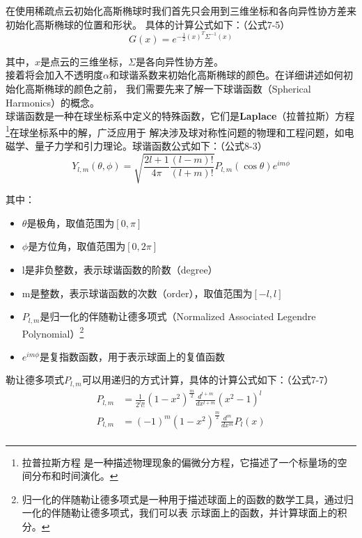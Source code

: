 \documentclass{nwputhesis}
\begin{document}
\indent
在使用稀疏点云初始化高斯椭球时我们首先只会用到三维坐标和各向异性协方差来初始化高斯椭球的位置和形状。
具体的计算公式如下：（公式7-5）
\begin{equation}
    G(x) = e^{-\frac{1}{2}(x)^T\Sigma^{-1}(x)}
\end{equation}

\indent
其中，$x$是点云的三维坐标，$\Sigma$是各向异性协方差。\\
\indent
接着将会加入不透明度$\alpha$和球谐系数来初始化高斯椭球的颜色。在详细讲述如何初始化高斯椭球的颜色之前，
我们需要先来了解一下球谐函数（Spherical Harmonics）的概念。\\
\indent
球谐函数是一种在球坐标系中定义的特殊函数，它们是\textbf{Laplace}（拉普拉斯）方程\footnote{拉普拉斯方程
是一种描述物理现象的偏微分方程，它描述了一个标量场的空间分布和时间演化。}在球坐标系中的解，广泛应用于
解决涉及球对称性问题的物理和工程问题，如电磁学、量子力学和引力理论。球谐函数公式如下：（公式8-3）
\begin{equation}
    Y_{l,m}(\theta,\phi) = \sqrt{\frac{2l+1}{4\pi}\frac{(l-m)!}{(l+m)!}}P_{l,m}(\cos\theta)e^{im\phi}
\end{equation}

\indent
其中：
\begin{itemize}
    \item $\theta$是极角，取值范围为$[0,\pi]$
    \item $\phi$是方位角，取值范围为$[0,2\pi]$
    \item l是非负整数，表示球谐函数的阶数（degree）
    \item m是整数，表示球谐函数的次数（order），取值范围为$[-l,l]$
    \item $P_{l,m}$是归一化的伴随勒让德多项式（Normalized Associated Legendre Polynomial）\footnote{
    归一化的伴随勒让德多项式是一种用于描述球面上的函数的数学工具，通过归一化的伴随勒让德多项式，我们可以表
    示球面上的函数，并计算球面上的积分。}
    \item $e^{im\phi}$是复指数函数，用于表示球面上的复值函数
\end{itemize}

\indent
勒让德多项式$P_{l,m}$可以用递归的方式计算，具体的计算公式如下：（公式7-7）
\begin{equation}
    \begin{aligned}
        P_{l,m} &= \frac{1}{2^ll!}(1-x^2)^{\frac{m}{2}}\frac{d^{l+m}}{dx^{l+m}}(x^2-1)^l\\
        P_{l,m} &= (-1)^m(1-x^2)^{\frac{m}{2}}\frac{d^m}{dx^m}P_l(x)\\
    \end{aligned}
\end{equation}
\end{document}
